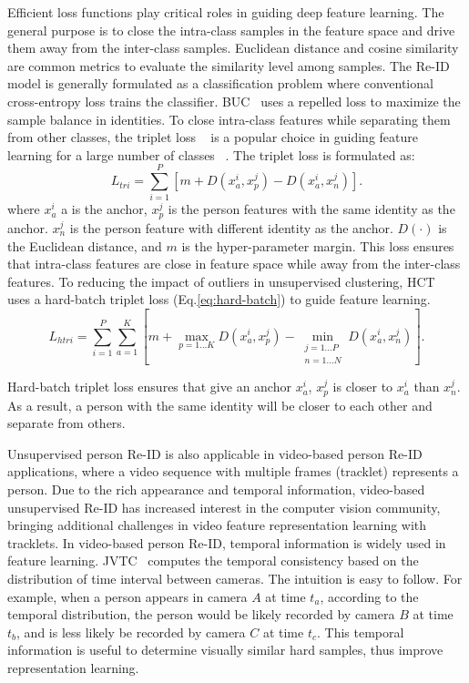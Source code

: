 \documentclass[a4paper,fleqn]{cas-dc}
\begin{document}
Efficient loss functions play critical roles in guiding deep feature learning. The general purpose is to close the intra-class samples in the feature space and drive them away from the inter-class samples. Euclidean distance and cosine similarity are common metrics to evaluate the similarity level among samples. The Re-ID model is generally formulated as a classification problem where conventional cross-entropy loss trains the classifier. BUC~\cite{lin_bottom-up_2019} uses a repelled loss to maximize the sample balance in identities. To close intra-class features while separating them from other classes, the triplet loss ~\cite{hermans_defense_2017} is a popular choice in guiding feature learning for a large number of classes ~\cite{wang_unsupervised_2020,xiang_second-order_2020,zhai_ad-cluster_2020}. The triplet loss is formulated as:
\begin{equation} \label{eq:triplet}
L_{tri} = \sum_{i=1}^P \left[m+D(x_a^i,x_p^j)-D(x_a^i,x_n^j)\right].
\end{equation}
where $x_a^i$ a is the anchor, $x_p^j$ is the person features with the same identity as the anchor. $x_n^j$ is the person feature with different identity as the anchor. $D(\cdot)$ is the Euclidean distance, and $m$ is the hyper-parameter margin. This loss ensures that intra-class features are close in feature space while away from the inter-class features. To reducing the impact of outliers in unsupervised clustering, HCT~\cite{zeng_hierarchical_2020} uses a hard-batch triplet loss (Eq.\ref{eq:hard-batch}) to guide feature learning.
\small
\begin{equation} \label{eq:hard-batch}
L_{htri}=\sum_{i=1}^P \sum_{a=1}^K \left[m+\max_{p=1...K}D(x_a^i,x_p^j)-\min_{\substack{j=1...P\\ n=1...N}}D(x_a^i,x_n^j) \right].
\end{equation}
\normalsize

Hard-batch triplet loss ensures that give an anchor $x_a^i$, $x_p^j$ is closer to $x_a^i$ than $x_n^j$. As a result, a person with the same identity will be closer to each other and separate from others.

Unsupervised person Re-ID is also applicable in video-based person Re-ID applications, where a video sequence with multiple frames (tracklet) represents a person. Due to the rich appearance and temporal information, video-based unsupervised Re-ID has increased interest in the computer vision community, bringing additional challenges in video feature representation learning with tracklets. In video-based person Re-ID, temporal information is widely used in feature learning. JVTC~\cite{vedaldi_joint_2020-1} computes the temporal consistency based on the distribution of time interval between cameras. The intuition is easy to follow. For example, when a person appears in camera $A$ at time $t_a$, according to the temporal distribution, the person would be likely recorded by camera $B$ at time $t_b$, and is less likely be recorded by camera $C$ at time $t_c$. This temporal information is useful to determine visually similar hard samples, thus improve representation learning. 
\end{document}
